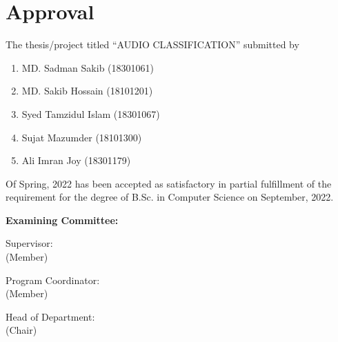 \section*{Approval}

The thesis/project titled “AUDIO CLASSIFICATION” submitted by 
\begin{enumerate}
  \item MD. Sadman Sakib (18301061)
  \item MD. Sakib Hossain (18101201)
  \item Syed Tamzidul Islam (18301067) 
  \item Sujat Mazumder (18101300)
  \item Ali Imran Joy (18301179)
\end{enumerate}

Of Spring, 2022 has been accepted as satisfactory in partial fulfillment of the requirement for the degree of B.Sc. in Computer Science on September, 2022. 

\vspace{0.5cm}
\textbf{Examining Committee:}

\vspace{1cm}

Supervisor:\\
(Member)
\begin{center}
    \hspace{7cm}  \hspace{1cm} 
\end{center}

Program Coordinator:\\
(Member)
\begin{center}
    \hspace{7cm}  \hspace{1cm} 
\end{center}

Head of Department:\\
(Chair)
\begin{center}
    \hspace{7cm}  \hspace{1cm} 
\end{center}

\pagebreak